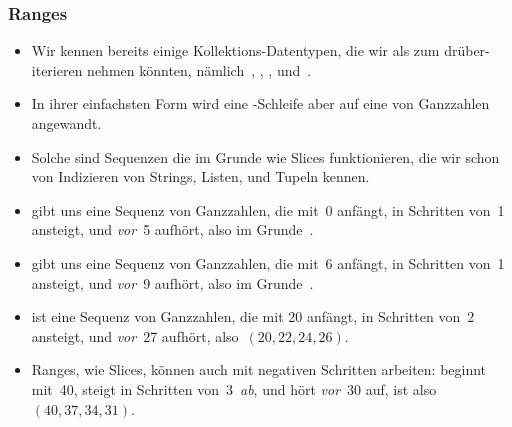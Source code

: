 \documentclass[aspectratio=169,mathserif,notheorems]{beamer}%
\begin{document}
\begin{frame}%
\frametitle{Ranges}%
\begin{itemize}%
\item Wir kennen bereits einige Kollektions-Datentypen, die wir als  zum drüber-iterieren nehmen könnten, nämlich~, , , und~.%
%
\item<2-> In ihrer einfachsten Form wird eine -Schleife aber auf eine  von Ganzzahlen angewandt.%
%
\item<3-> Solche  sind Sequenzen die im Grunde wie Slices funktionieren, die wir schon von Indizieren von Strings, Listen, und Tupeln kennen.%
%
\item<4->  gibt uns eine Sequenz von Ganzzahlen, die mit~0 anfängt, in Schritten von~1 ansteigt, und \emph{vor}~5 aufhört, also im Grunde~.%
%
\item<5->  gibt uns eine Sequenz von Ganzzahlen, die mit~6 anfängt, in Schritten von~1 ansteigt, und \emph{vor}~9 aufhört, also im Grunde~.%
%
\item<6->  ist eine Sequenz von Ganzzahlen, die mit 20 anfängt, in Schritten von~2 ansteigt, und \emph{vor}~27 aufhört, also~$(20, 22, 24, 26)$.%
%
\item<7-> Ranges, wie Slices, können auch mit negativen Schritten arbeiten:  beginnt mit~40, steigt in Schritten von~3~\emph{ab}, und hört \emph{vor}~30 auf, ist also~$(40, 37, 34, 31)$.%
\end{itemize}%
\end{frame}%
%
%
\end{document}
